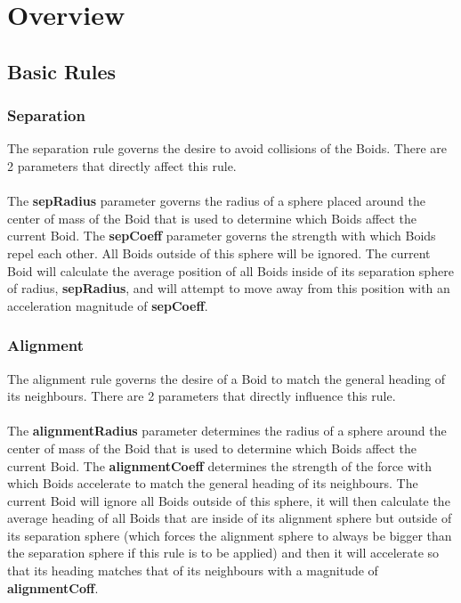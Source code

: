 \documentclass[12pt]{article}
\begin{document}
\section{Overview}
\subsection{Basic Rules}
\subsubsection{Separation}
The separation rule governs the desire to avoid collisions of the Boids. There are 2 parameters that directly affect this rule.
\\ \\
The \textbf{sepRadius} parameter governs the radius of a sphere placed around the center of mass of the Boid that is used to determine which Boids affect the current Boid. The \textbf{sepCoeff} parameter governs the strength with which Boids repel each other. All Boids outside of this sphere will be ignored. The current Boid will calculate the average position of all Boids inside of its separation sphere of radius, \textbf{sepRadius}, and will attempt to move away from this position with an acceleration magnitude of \textbf{sepCoeff}.

\subsubsection{Alignment}
The alignment rule governs the desire of a Boid to match the general heading of its neighbours. There are 2 parameters that directly influence this rule.
\\ \\
The \textbf{alignmentRadius} parameter determines the radius of a sphere around the center of mass of the Boid that is used to determine which Boids affect the current Boid. The \textbf{alignmentCoeff} determines the strength of the force with which Boids accelerate to match the general heading of its neighbours. The current Boid will ignore all Boids outside of this sphere, it will then calculate the average heading of all Boids that are inside of its alignment sphere but outside of its separation sphere (which forces the alignment sphere to always be bigger than the separation sphere if this rule is to be applied) and then it will accelerate so that its heading matches that of its neighbours with a magnitude of \textbf{alignmentCoff}.
\end{document}
